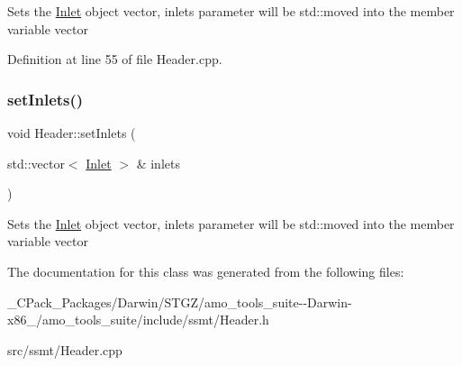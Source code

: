 Sets the \hyperlink{class_inlet}{Inlet} object vector, inlets parameter will be std\+::moved into the member variable vector 

Definition at line 55 of file Header.\+cpp.

\mbox{\label{class_header_ae69b6f894210a6cd340e92222f8bc343}} 
\subsubsection{\texorpdfstring{set\+Inlets()}{setInlets()}\hspace{0.1cm}{\footnotesize\ttfamily [3/3]}}
{\footnotesize\ttfamily void Header\+::set\+Inlets (\begin{DoxyParamCaption}\item[{std\+::vector$<$ \hyperlink{class_inlet}{Inlet} $>$ \&}]{inlets }\end{DoxyParamCaption})}

Sets the \hyperlink{class_inlet}{Inlet} object vector, inlets parameter will be std\+::moved into the member variable vector 

The documentation for this class was generated from the following files\+:\begin{DoxyCompactItemize}
\item 
\+\_\+\+C\+Pack\+\_\+\+Packages/\+Darwin/\+S\+T\+G\+Z/amo\+\_\+tools\+\_\+suite-\/-\/\+Darwin-\/x86\+\_/amo\+\_\+tools\+\_\+suite/include/ssmt/Header.\+h\item 
src/ssmt/Header.\+cpp\end{DoxyCompactItemize}
